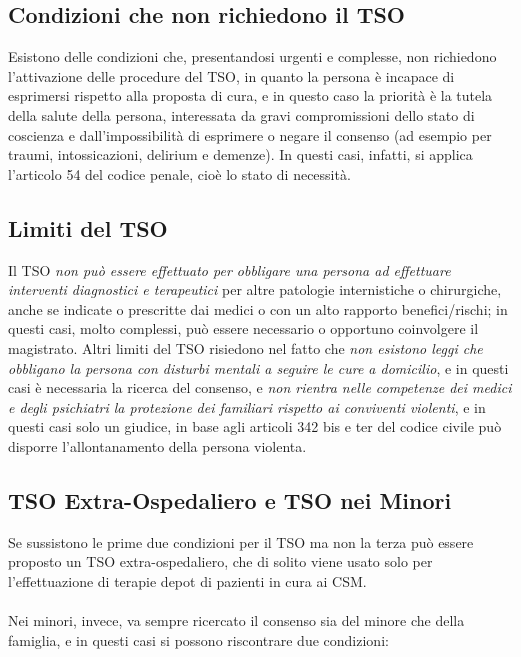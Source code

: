 \subsection{Condizioni che non richiedono il TSO}

Esistono delle condizioni che, presentandosi urgenti e complesse, non
richiedono l'attivazione delle procedure del TSO, in quanto la persona è
incapace di esprimersi rispetto alla proposta di cura, e in questo caso
la priorità è la tutela della salute della persona, interessata da gravi
compromissioni dello stato di coscienza e dall'impossibilità di
esprimere o negare il consenso (ad esempio per traumi, intossicazioni,
delirium e demenze). In questi casi, infatti, si applica l'articolo 54
del codice penale, cioè lo stato di necessità.

\subsection{Limiti del TSO}

Il TSO \emph{non può essere effettuato per obbligare una persona ad
effettuare interventi diagnostici e terapeutici} per altre patologie
internistiche o chirurgiche, anche se indicate o prescritte dai medici o
con un alto rapporto benefici/rischi; in questi casi, molto complessi,
può essere necessario o opportuno coinvolgere il magistrato. Altri
limiti del TSO risiedono nel fatto che \emph{non esistono leggi che
obbligano la persona con disturbi mentali a seguire le cure a
domicilio}, e in questi casi è necessaria la ricerca del consenso, e
\emph{non rientra nelle competenze dei medici e degli psichiatri la
protezione dei familiari rispetto ai conviventi violenti}, e in questi
casi solo un giudice, in base agli articoli 342 bis e ter del codice
civile può disporre l'allontanamento della persona violenta.

\subsection{TSO Extra-Ospedaliero e TSO nei Minori}

Se sussistono le prime due condizioni per il TSO ma non la terza può
essere proposto un TSO extra-ospedaliero, che di solito viene usato solo
per l'effettuazione di terapie depot di pazienti in cura ai CSM.
\\\\
Nei minori, invece, va sempre ricercato il consenso sia del minore che
della famiglia, e in questi casi si possono riscontrare due condizioni:


